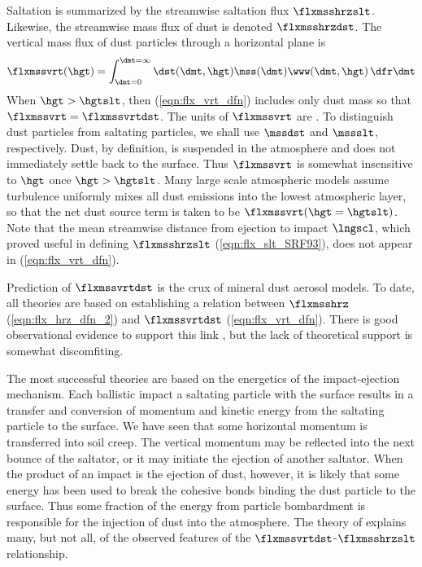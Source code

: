 \documentclass[12pt,twoside]{book}
\begin{document}
Saltation is summarized by the streamwise saltation flux $\flxmsshrzslt$.
Likewise, the streamwise mass flux of dust is denoted $\flxmsshrzdst$.
The vertical mass flux of dust particles through a horizontal plane is 
\begin{equation}
\flxmssvrt(\hgt) = \int_{\dmt = 0}^{\dmt = \infty} 
\dst(\dmt,\hgt) \mss(\dmt) \www(\dmt,\hgt) \,\dfr\dmt
\label{eqn:flx_vrt_dfn}
\end{equation}
When $\hgt > \hgtslt$, then (\ref{eqn:flx_vrt_dfn}) includes only dust
mass so that $\flxmssvrt = \flxmssvrtdst$.
The units of $\flxmssvrt$ are \kgxmSs.
To distinguish dust particles from saltating particles, we shall use
$\mssdst$ and $\mssslt$, respectively.
Dust, by definition, is suspended in the atmosphere and does not
immediately settle back to the surface.
Thus $\flxmssvrt$ is somewhat insensitive to $\hgt$ once $\hgt >
\hgtslt$. 
Many large scale atmospheric models assume turbulence uniformly mixes 
all dust emissions into the lowest atmospheric layer, so that the net
dust source term is taken to be $\flxmssvrt(\hgt = \hgtslt)$.
Note that the mean streamwise distance from ejection to impact
$\lngscl$, which proved useful in defining $\flxmsshrzslt$
(\ref{eqn:flx_slt_SRF93}), does not appear in (\ref{eqn:flx_vrt_dfn}).   

Prediction of $\flxmssvrtdst$ is the crux of mineral dust aerosol models.
To date, all theories are based on establishing a relation between 
$\flxmsshrz$ (\ref{eqn:flx_hrz_dfn_2}) and $\flxmssvrtdst$
(\ref{eqn:flx_vrt_dfn}). 
There is good observational evidence to support this link
\cite[e.g.,]{SRF93,GFG97}, but the lack of theoretical support is
somewhat discomfiting.  

The most successful theories are based on the energetics of the
impact-ejection mechanism.
Each ballistic impact a saltating particle with the surface results in 
a transfer and conversion of momentum and kinetic energy from the
saltating particle to the surface.
We have seen that some horizontal momentum is transferred into
soil creep.
The vertical momentum may be reflected into the next bounce of the
saltator, or it may initiate the ejection of another saltator.
When the product of an impact is the ejection of dust, however, it is
likely that some energy has been used to break the cohesive bonds
binding the dust particle to the surface.
Thus some fraction of the energy from particle bombardment is
responsible for the injection of dust into the atmosphere.   
The theory of \cite{SRF93} explains many, but not all, of the observed
features of the $\flxmssvrtdst$-$\flxmsshrzslt$ relationship.
\end{document}
